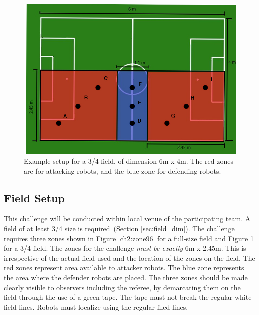 \begin{figure}[ht]
\includegraphics[width=0.95\linewidth]{figs/ch_2_reduced.jpg}
\caption{Example setup for a 3/4 field, of dimension 6m x 4m. The red zones are for attacking robots, and the blue zone for defending robots.
}
\label{ch2:zone64}
\centering
\end{figure}


\subsection{Field Setup}
This challenge will be conducted within local venue of the participating team. A field of at least 3/4 size is required~(\cf Section \ref{sec:field_dim}). 
The challenge requires three zones shown in Figure \ref{ch2:zone96} for a full-size field and Figure \ref{ch2:zone64} for a 3/4 field. The zones for the challenge \textit{must be exactly} 6m x 2.45m. This is irrespective of the actual field used and the location of the zones on the field.
The red zones represent area available to attacker robots. The blue zone represents the area where the defender robots are placed.
The three zones should be made clearly visible to observers including the referee, by demarcating them on the field through the use of a green tape. The tape must not break the regular white field lines.
Robots must localize using the regular filed lines.


